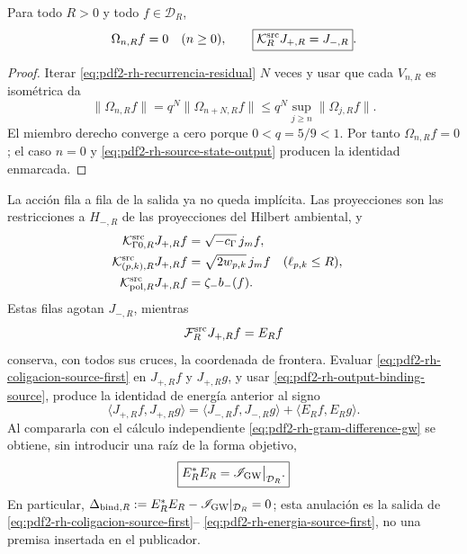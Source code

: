 \begin{proposition}
\label{prop:pdf2-rh-omega-cero}
Para todo \(R>0\) y todo \(f\in\mathcal D_R\),
\begin{equation}\label{eq:pdf2-rh-output-binding-source}
 \Omega_{n,R}f=0\quad(n\geq0),
 \qquad
 \boxed{\mathcal K_R^{\rm src}J_{+,R}=J_{-,R}}.
\end{equation}
\end{proposition}

\begin{proof}
Iterar \eqref{eq:pdf2-rh-recurrencia-residual} \(N\) veces y usar que cada
\(V_{n,R}\) es isométrica da
\[
 \|\Omega_{n,R}f\|
 =q^N\|\Omega_{n+N,R}f\|
 \leq q^N\sup_{j\geq n}\|\Omega_{j,R}f\|.
\]
El miembro derecho converge a cero porque \(0<q=5/9<1\). Por tanto
\(\Omega_{n,R}f=0\); el caso \(n=0\) y
\eqref{eq:pdf2-rh-source-state-output} producen la identidad enmarcada.
\end{proof}

La acción fila a fila de la salida ya no queda implícita. Las proyecciones son
las restricciones a \(H_{-,R}\) de las proyecciones del Hilbert ambiental, y
\begin{equation}\label{eq:pdf2-rh-salidas-generador-a-generador}
\begin{aligned}
 \mathcal K_{\Gamma0,R}^{\rm src}J_{+,R}f
  &=\sqrt{-c_\Gamma}\,j_mf,\\
 \mathcal K_{(p,k),R}^{\rm src}J_{+,R}f
  &=\sqrt{2w_{p,k}}\,j_mf
  &&(\ell_{p,k}\leq R),\\
 \mathcal K_{{\rm pol},R}^{\rm src}J_{+,R}f
  &=\zeta_-b_-(f).
\end{aligned}
\end{equation}
Estas filas agotan \(J_{-,R}\), mientras
\begin{equation}\label{eq:pdf2-rh-frontera-generador-a-generador}
 \mathcal F_R^{\rm src}J_{+,R}f=E_Rf
\end{equation}
conserva, con todos sus cruces, la coordenada de frontera.
Evaluar \eqref{eq:pdf2-rh-coligacion-source-first} en \(J_{+,R}f\) y
\(J_{+,R}g\), y usar \eqref{eq:pdf2-rh-output-binding-source}, produce la
identidad de energía anterior al signo
\begin{equation}\label{eq:pdf2-rh-energia-source-first}
 \boxed{
 \langle J_{+,R}f,J_{+,R}g\rangle
 =\langle J_{-,R}f,J_{-,R}g\rangle
  +\langle E_Rf,E_Rg\rangle.}
\end{equation}
Al compararla con el cálculo independiente
\eqref{eq:pdf2-rh-gram-difference-gw} se obtiene, sin introducir una raíz de
la forma objetivo,
\begin{equation}\label{eq:pdf2-rh-binding-source-first}
 \boxed{E_R^*E_R=\mathscr I_{\rm GW}\big|_{\mathcal D_R}.}
\end{equation}
En particular,
\(\Delta_{{\rm bind},R}
:=E_R^*E_R-\mathscr I_{\rm GW}|_{\mathcal D_R}=0\); esta anulación es la
salida de \eqref{eq:pdf2-rh-coligacion-source-first}--
\eqref{eq:pdf2-rh-energia-source-first}, no una premisa insertada en el
publicador.

